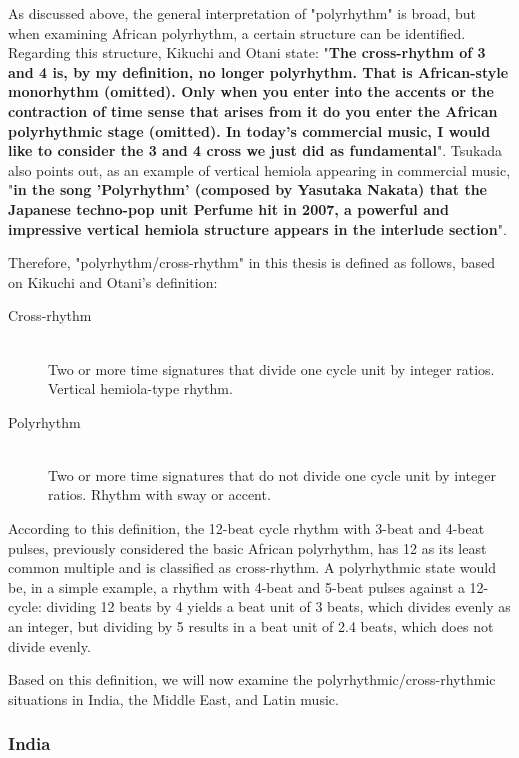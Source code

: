 As discussed above, the general interpretation of "polyrhythm" is broad, but when examining African polyrhythm, a certain structure can be identified. Regarding this structure, Kikuchi and Otani state: "\textbf{The cross-rhythm of 3 and 4 is, by my definition, no longer polyrhythm. That is African-style monorhythm (omitted). Only when you enter into the accents or the contraction of time sense that arises from it do you enter the African polyrhythmic stage (omitted). In today's commercial music, I would like to consider the 3 and 4 cross we just did as fundamental}"\cite{kikuchi-ootani:01}. Tsukada also points out, as an example of vertical hemiola appearing in commercial music, "\textbf{in the song 'Polyrhythm' (composed by Yasutaka Nakata) that the Japanese techno-pop unit Perfume hit in 2007, a powerful and impressive vertical hemiola structure appears in the interlude section}"\cite{tsukada:01}.

Therefore, "polyrhythm/cross-rhythm" in this thesis is defined as follows, based on Kikuchi and Otani's definition:

\begin{description}
 \item[Cross-rhythm]\mbox{}\\
	    Two or more time signatures that divide one cycle unit by integer ratios. Vertical hemiola-type rhythm.
 \item[Polyrhythm]\mbox{}\\
	    Two or more time signatures that do not divide one cycle unit by integer ratios. Rhythm with sway or accent.
\end{description}

According to this definition, the 12-beat cycle rhythm with 3-beat and 4-beat pulses, previously considered the basic African polyrhythm, has 12 as its least common multiple and is classified as cross-rhythm. A polyrhythmic state would be, in a simple example, a rhythm with 4-beat and 5-beat pulses against a 12-cycle: dividing 12 beats by 4 yields a beat unit of 3 beats, which divides evenly as an integer, but dividing by 5 results in a beat unit of 2.4 beats, which does not divide evenly.

Based on this definition, we will now examine the polyrhythmic/cross-rhythmic situations in India, the Middle East, and Latin music.

\subsubsection{India}

